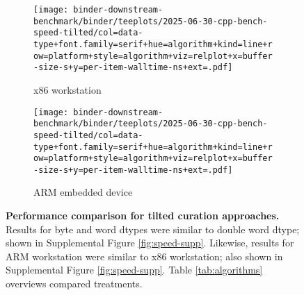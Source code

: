 \begin{figure}


\begin{subfigure}{\linewidth}
\texttt{[image: binder-downstream-benchmark/binder/teeplots/2025-06-30-cpp-bench-speed-tilted/col=data-type+font.family=serif+hue=algorithm+kind=line+row=platform+style=algorithm+viz=relplot+x=buffer-size-s+y=per-item-walltime-ns+ext=.pdf]}
\caption{\small x86 workstation}
\label{fig:speed:thinkpad}
\end{subfigure}

\begin{subfigure}{\linewidth}
\texttt{[image: binder-downstream-benchmark/binder/teeplots/2025-06-30-cpp-bench-speed-tilted/col=data-type+font.family=serif+hue=algorithm+kind=line+row=platform+style=algorithm+viz=relplot+x=buffer-size-s+y=per-item-walltime-ns+ext=.pdf]}
\caption{\small ARM embedded device}
\label{fig:speed:pi}
\end{subfigure}

\caption{%
\textbf{Performance comparison for tilted curation approaches.}
\small
Results for byte and word dtypes were similar to double word dtype; shown in Supplemental Figure \ref{fig:speed-supp}.
Likewise, results for ARM workstation were similar to x86 workstation; also shown in Supplemental Figure \ref{fig:speed-supp}.
Table \ref{tab:algorithms} overviews compared treatments.
}
\label{fig:speed}
\end{figure}
